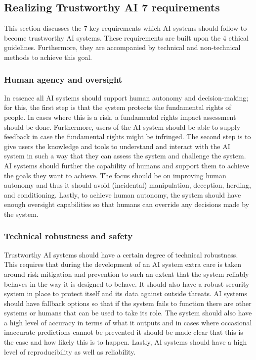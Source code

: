 \subsection{Realizing Trustworthy AI 7 requirements}
This section discusses the 7 key requirements which AI systems should follow to become trustworthy AI systems. These requirements are built upon the 4 ethical guidelines. Furthermore, they are accompanied by technical and non-technical methods to achieve this goal.
\subsubsection*{Human agency and oversight}
In essence all AI systems should support human autonomy and decision-making; for this, the first step is that the system protects the fundamental rights of people. In cases where this is a risk, a fundamental rights impact assessment should be done. Furthermore, users of the AI system should be able to supply feedback in case the fundamental rights might be infringed. The second step is to give users the knowledge and tools to understand and interact with the AI system in such a way that they can assess the system and challenge the system. AI systems should further the capability of humans and support them to achieve the goals they want to achieve. The focus should be on improving human autonomy and thus it should avoid (incidental) manipulation, deception, herding, and conditioning. Lastly, to achieve human autonomy, the system should have enough oversight capabilities so that humans can override any decisions made by the system.
\subsubsection*{Technical robustness and safety}
Trustworthy AI systems should have a certain degree of technical robustness. This requires that during the development of an AI system extra care is taken around risk mitigation and prevention to such an extent that the system reliably behaves in the way it is designed to behave. It should also have a robust security system in place to protect itself and its data against outside threats. AI systems should have fallback options so that if the system fails to function there are other systems or humans that can be used to take its role. The system should also have a high level of accuracy in terms of what it outputs and in cases where occasional inaccurate predictions cannot be prevented it should be made clear that this is the case and how likely this is to happen. Lastly, AI systems should have a high level of reproducibility as well as reliability.
